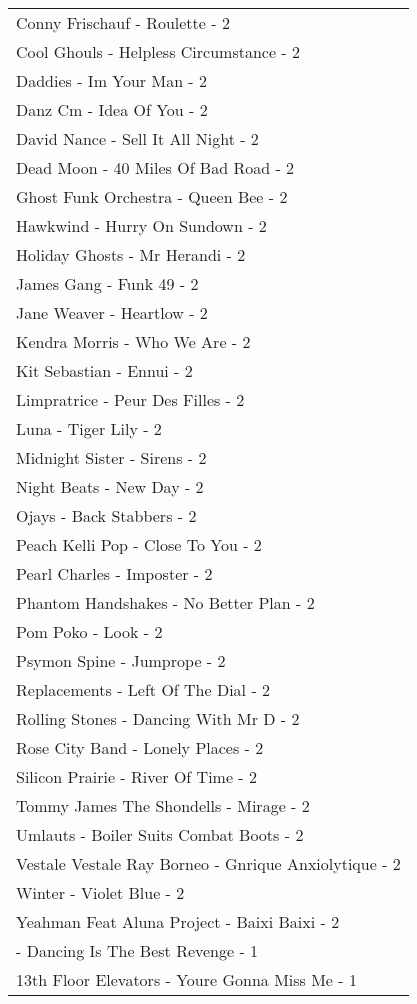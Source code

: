 \documentclass[
]{article}
\begin{document}
\begin{longtable}{l}
Conny Frischauf - Roulette - 2 \\ 
Cool Ghouls - Helpless Circumstance - 2 \\ 
Daddies - Im Your Man - 2 \\ 
Danz Cm - Idea Of You - 2 \\ 
David Nance - Sell It All Night - 2 \\ 
Dead Moon - 40 Miles Of Bad Road - 2 \\ 
Ghost Funk Orchestra - Queen Bee - 2 \\ 
Hawkwind - Hurry On Sundown - 2 \\ 
Holiday Ghosts - Mr Herandi - 2 \\ 
James Gang - Funk 49 - 2 \\ 
Jane Weaver - Heartlow - 2 \\ 
Kendra Morris - Who We Are - 2 \\ 
Kit Sebastian - Ennui - 2 \\ 
Limpratrice - Peur Des Filles - 2 \\ 
Luna - Tiger Lily - 2 \\ 
Midnight Sister - Sirens - 2 \\ 
Night Beats - New Day - 2 \\ 
Ojays - Back Stabbers - 2 \\ 
Peach Kelli Pop - Close To You - 2 \\ 
Pearl Charles - Imposter - 2 \\ 
Phantom Handshakes - No Better Plan - 2 \\ 
Pom Poko - Look - 2 \\ 
Psymon Spine - Jumprope - 2 \\ 
Replacements - Left Of The Dial - 2 \\ 
Rolling Stones - Dancing With Mr D - 2 \\ 
Rose City Band - Lonely Places - 2 \\ 
Silicon Prairie - River Of Time - 2 \\ 
Tommy James The Shondells - Mirage - 2 \\ 
Umlauts - Boiler Suits Combat Boots - 2 \\ 
Vestale Vestale Ray Borneo - Gnrique Anxiolytique - 2 \\ 
Winter - Violet Blue - 2 \\ 
Yeahman Feat Aluna Project - Baixi Baixi - 2 \\ 
 - Dancing Is The Best Revenge - 1 \\ 
13th Floor Elevators - Youre Gonna Miss Me - 1 \\ 

\end{longtable}
\end{document}
